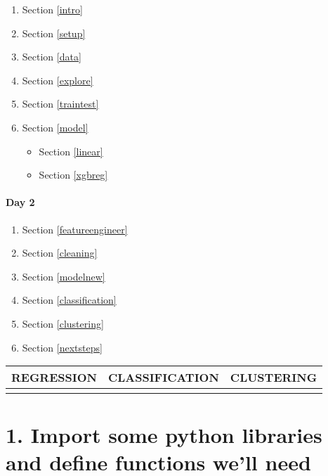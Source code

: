 \documentclass[11pt]{article}
\providecommand{\tightlist}{%
      \setlength{\itemsep}{0pt}\setlength{\parskip}{0pt}}
\begin{document}
\begin{enumerate}
\def\labelenumi{\arabic{enumi}.}
\setcounter{enumi}{-1}
\tightlist
\item
  Section \ref{intro}
\item
  Section \ref{setup}
\item
  Section \ref{data}
\item
  Section \ref{explore}
\item
  Section \ref{traintest}
\item
  Section \ref{model}

  \begin{itemize}
  \tightlist
  \item
    Section \ref{linear}
  \item
    Section \ref{xgbreg}
  \end{itemize}
\end{enumerate}

\paragraph{Day 2}\label{day-2}

\begin{enumerate}
\def\labelenumi{\arabic{enumi}.}
\setcounter{enumi}{5}
\tightlist
\item
  Section \ref{featureengineer}
\item
  Section \ref{cleaning}
\item
  Section \ref{modelnew}
\item
  Section \ref{classification}\\
\item
  Section \ref{clustering}
\item
  Section \ref{nextsteps}
\end{enumerate}

\begin{longtable}[]{@{}lll@{}}
\toprule
REGRESSION & CLASSIFICATION & CLUSTERING\tabularnewline
\midrule
\endhead
& &\tabularnewline
\bottomrule
\end{longtable}

    \section{1. Import some python libraries and define functions we'll need
}\label{import-some-python-libraries-and-define-functions-well-need}
\end{document}
